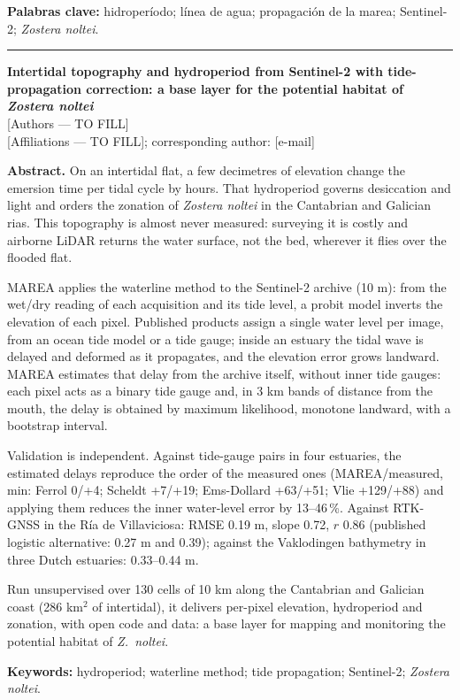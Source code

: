 \documentclass[11pt,a4paper]{article}
\begin{document}
\textbf{Palabras clave:} hidroperíodo; línea de agua; propagación de la marea;
Sentinel-2; \emph{Zostera noltei}.

\vspace{1.2em}
\hrule
\vspace{1.2em}


\begin{center}
{\large\bfseries Intertidal topography and hydroperiod from Sentinel-2 with
tide-propagation correction: a base layer for the potential habitat of
\emph{Zostera noltei}}\\[0.5em]
[Authors --- TO FILL]\\
{\small [Affiliations --- TO FILL]; corresponding author: [e-mail]}
\end{center}

\textbf{Abstract.} On an intertidal flat, a few decimetres of elevation change
the emersion time per tidal cycle by hours. That hydroperiod governs
desiccation and light and orders the zonation of \emph{Zostera noltei} in the
Cantabrian and Galician rias. This topography is almost never measured:
surveying it is costly and airborne LiDAR returns the water surface, not the
bed, wherever it flies over the flooded flat.

MAREA applies the waterline method to the Sentinel-2 archive (10 m): from the
wet/dry reading of each acquisition and its tide level, a probit model inverts
the elevation of each pixel. Published products assign a single water level
per image, from an ocean tide model or a tide gauge; inside an estuary the
tidal wave is delayed and deformed as it propagates, and the elevation error
grows landward. MAREA estimates that delay from the archive itself, without
inner tide gauges: each pixel acts as a binary tide gauge and, in 3 km bands
of distance from the mouth, the delay is obtained by maximum likelihood,
monotone landward, with a bootstrap interval.

Validation is independent. Against tide-gauge pairs in four estuaries, the
estimated delays reproduce the order of the measured ones (MAREA/measured,
min: Ferrol 0/+4; Scheldt +7/+19; Ems-Dollard +63/+51; Vlie +129/+88) and
applying them reduces the inner water-level error by 13--46\,\%. Against
RTK-GNSS in the Ría de Villaviciosa: RMSE 0.19 m, slope 0.72, $r$ 0.86
(published logistic alternative: 0.27 m and 0.39); against the Vaklodingen
bathymetry in three Dutch estuaries: 0.33--0.44 m.

Run unsupervised over 130 cells of 10 km along the Cantabrian and Galician
coast (286 km$^2$ of intertidal), it delivers per-pixel elevation, hydroperiod
and zonation, with open code and data: a base layer for mapping
and monitoring the potential habitat of \emph{Z.\ noltei}.

\textbf{Keywords:} hydroperiod; waterline method; tide propagation;
Sentinel-2; \emph{Zostera noltei}.
\end{document}
